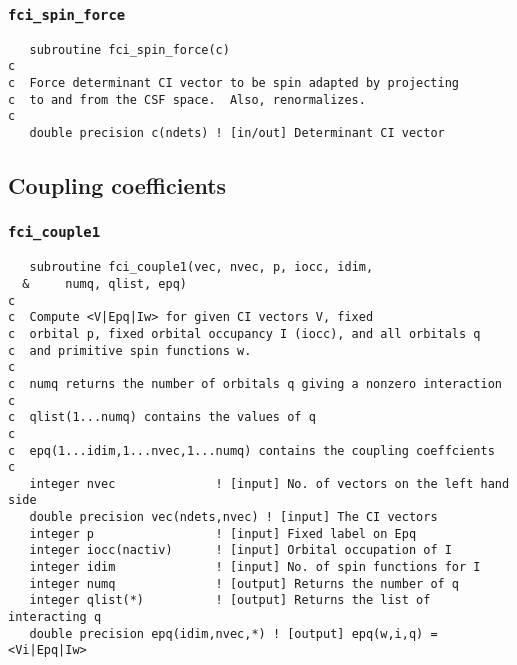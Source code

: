 \subsubsection{{\tt fci\_spin\_force}}
\begin{verbatim}
   subroutine fci_spin_force(c)
c  
c  Force determinant CI vector to be spin adapted by projecting
c  to and from the CSF space.  Also, renormalizes.
c     
   double precision c(ndets) ! [in/out] Determinant CI vector
\end{verbatim}

\subsection{Coupling coefficients}

\subsubsection{{\tt fci\_couple1}}

\begin{verbatim}
   subroutine fci_couple1(vec, nvec, p, iocc, idim, 
  &     numq, qlist, epq)
c  
c  Compute <V|Epq|Iw> for given CI vectors V, fixed 
c  orbital p, fixed orbital occupancy I (iocc), and all orbitals q
c  and primitive spin functions w.
c  
c  numq returns the number of orbitals q giving a nonzero interaction
c  
c  qlist(1...numq) contains the values of q
c  
c  epq(1...idim,1...nvec,1...numq) contains the coupling coeffcients
c  
   integer nvec              ! [input] No. of vectors on the left hand side
   double precision vec(ndets,nvec) ! [input] The CI vectors
   integer p                 ! [input] Fixed label on Epq
   integer iocc(nactiv)      ! [input] Orbital occupation of I
   integer idim              ! [input] No. of spin functions for I
   integer numq              ! [output] Returns the number of q
   integer qlist(*)          ! [output] Returns the list of interacting q
   double precision epq(idim,nvec,*) ! [output] epq(w,i,q) = <Vi|Epq|Iw>
\end{verbatim}

